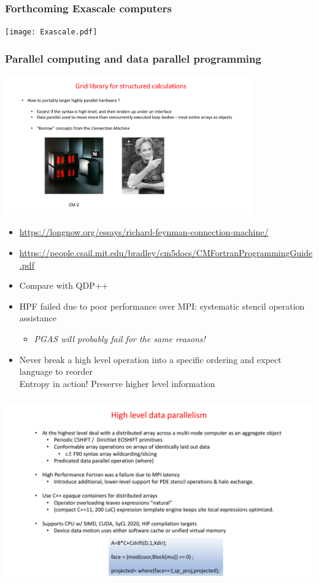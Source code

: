 \documentclass[pdf,ps,8pt]{beamer}
\newcommand{\link}[1]{\href{#1}{ {\color{blue} #1} }}
\begin{document}
\begin{frame}[fragile]\small\frametitle{ Forthcoming Exascale computers}
\texttt{[image: Exascale.pdf]}
\end{frame}

\begin{frame}[fragile]\small\frametitle{ Parallel computing and data parallel programming}

\includegraphics[width=0.8\textwidth]{CMfortran.pdf}

\begin{itemize}
  \item \link{https://longnow.org/essays/richard-feynman-connection-machine/}
  \item \link{https://people.csail.mit.edu/bradley/cm5docs/CMFortranProgrammingGuide.pdf}
  \item Compare with QDP++
  \item HPF failed due to poor performance over MPI: {\color{red}systematic stencil operation assistance}
\begin{itemize}
  \item \emph{PGAS will probably fail for the same reasons!}
\end{itemize}
\item Never break a high level operation into a specific ordering and expect language to reorder \\
      Entropy in action! Preserve higher level information
\end{itemize}
\end{frame}

\begin{frame}[fragile]\small\frametitle{ }
\includegraphics[width=\textwidth]{DPexample.pdf}
\end{frame}
\end{document}
